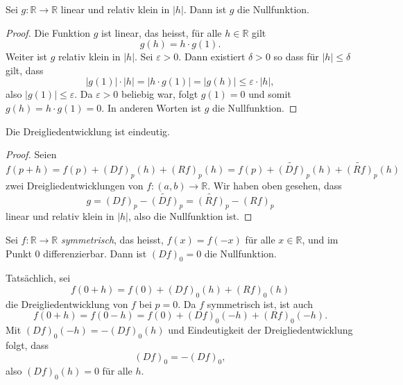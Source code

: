 \documentclass[../main.tex]{subfiles}
\begin{document}
\begin{lemma*}
  Sei $g \colon \mathbb{R} \to \mathbb{R}$ linear und
  relativ klein in $|h|$.
  Dann ist $g$ die Nullfunktion.
\end{lemma*}

\begin{proof}
  Die Funktion $g$ ist linear, das heisst, für alle
  $h \in \mathbb{R}$ gilt
  \[
    g(h) = h \cdot g(1).
  \]
  Weiter ist $g$ relativ klein in $|h|$.
  Sei $\varepsilon > 0$. Dann existiert
  $\delta > 0$ so dass für $|h| \leq \delta$ 
  gilt, dass
  \[
   |g(1)| \cdot |h| = |h \cdot g(1) | = |g(h)| \leq \varepsilon \cdot |h|,
  \]
  also $|g(1)| \leq \varepsilon$.
  Da $\varepsilon > 0$ beliebig war, folgt
  $g(1) = 0$ und somit $g(h) = h \cdot g(1) = 0$.
  In anderen Worten ist $g$ die Nullfunktion.
\end{proof}

\begin{corollary*}
  Die Dreigliedentwicklung ist eindeutig.
\end{corollary*}

\begin{proof}
Seien
\[
  f(p + h) = f(p) + {(Df)}_p(h) + {(Rf)}_p(h)
  = f(p) + \widetilde{{(Df)}}_p(h) + \widetilde{{(Rf)}}_p(h)
\]
zwei Dreigliedentwicklungen von $f \colon (a, b) \to \mathbb{R}$.
Wir haben oben gesehen, dass
\[
  g = 
{(Df)}_p - \widetilde{{(Df)}}_p 
  = \widetilde{{(Rf)}}_p-{(Rf)}_p 
\]
linear und relativ klein in $|h|$, also
die Nullfunktion ist.
\end{proof}

\begin{application}
  Sei $f \colon \mathbb{R} \to \mathbb{R}$ \emph{symmetrisch},
  das heisst, $f(x) = f(-x)$ für alle $x \in \mathbb{R}$,
  und im Punkt $0$ differenzierbar.
  Dann ist ${(Df)}_0 = 0$ die Nullfunktion.

  Tatsächlich, sei
  \[
    f(0 + h) = f(0) + {(Df)}_0(h) + {(Rf)}_0(h)
  \]
  die Dreigliedentwicklung von $f$ bei $p = 0$.
  Da $f$ symmetrisch ist, ist auch
  \[
    f(0 + h) = f(0 - h) = f(0) + {(Df)}_0(-h) + {(Rf)}_0(-h).
  \]
  Mit ${(Df)}_0(-h) = - {(Df)}_0(h)$ und Eindeutigkeit
  der Dreigliedentwicklung folgt, dass
  \[
    {(Df)}_0 = - {(Df)}_0,
  \]
  also ${(Df)}_0(h) = 0$ für alle $h$.
\end{application}
\end{document}
